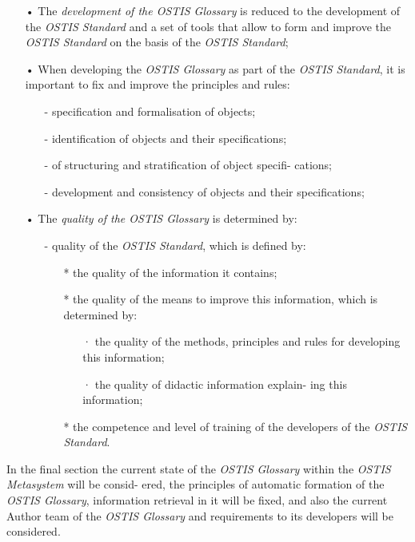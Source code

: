 \documentclass{article}
\begin{document}
\begin{multicols}{2}
\begin{itemize}
\item[•]The \textit{development of the OSTIS Glossary} is reduced
to the development of the \textit{OSTIS Standard} and a set
of tools that allow to form and improve the \textit{OSTIS Standard} on the basis of the \textit{OSTIS Standard};
\item[•]When developing the \textit{OSTIS Glossary} as part of the
\textit{OSTIS Standard}, it is important to fix and improve
the principles and rules:
\begin{itemize}
\item[-]specification and formalisation of objects;
\item[-]identification of objects and their specifications;
\item[-]of structuring and stratification of object specifi-
cations;
\item[-]development and consistency of objects and their
specifications;
\end{itemize}
\item[•]The \textit{quality of the OSTIS Glossary} is determined by:
\begin{itemize}
\item[-]quality of the \textit{OSTIS Standard}, which is defined
by:
\begin{itemize}
\item[*]the quality of the information it contains;
\item[*]the quality of the means to improve this
information, which is determined by:
\begin{itemize}
\item[·]the quality of the methods, principles and
rules for developing this information;
\item[·]the quality of didactic information explain-
ing this information;
\end{itemize}
\item[*]the competence and level of training of the
developers of the \textit{OSTIS Standard}.

\end{itemize}
\end{itemize}
\end{itemize}

\quad
In the final section the current state of the \textit{OSTIS
Glossary} within the \textit{OSTIS Metasystem} will be consid-
ered, the principles of automatic formation of the \textit{OSTIS
Glossary}, information retrieval in it will be fixed, and
also the current Author team of the \textit{OSTIS Glossary} and
requirements to its developers will be considered.


\end{multicols}
\end{document}
